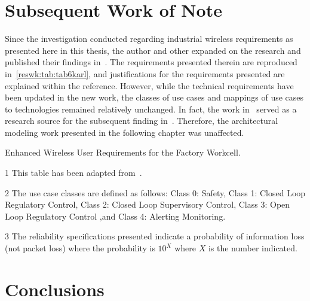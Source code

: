 	\section{Subsequent Work of Note}
	
	Since the investigation conducted regarding industrial wireless requirements as presented here in this thesis, the author and other expanded on the research and published their findings in~\cite{Montgomery2019}.  The requirements presented therein are reproduced in~\ref{reswk:tab:tab6karl}, and justifications for the requirements presented are explained within the reference.  However, while the technical requirements have been updated in the new work, the classes of use cases and mappings of use cases to technologies remained relatively unchanged. In fact, the work in~\cite{CandellRW2017} served as a research source for the subsequent finding in~\cite{Montgomery2019}.  Therefore, the architectural modeling work presented in the following chapter was unaffected.
	
	
	
	\begin{table}[tbph!]
		\centering
		\caption{Enhanced Wireless User Requirements for the Factory Workcell.}\label{reswk:tab:tab6karl}
		\begin{threeparttable}[t]
		
		\vspace{3pt}
		\raggedright		
		\begin{tablenotes}
		\item[1] This table has been adapted from~\cite{Montgomery2019}. 
		\item[2] The use case classes are defined as follows: Class 0: Safety, Class 1: Closed Loop Regulatory Control, Class 2: Closed Loop Supervisory Control, Class 3: Open Loop Regulatory Control ,and Class 4: Alerting Monitoring.		
		\item[3] The reliability specifications presented indicate a probability of information loss (not packet loss) where the probability is $10^X$ where $X$ is the number indicated.
		\end{tablenotes}
		\end{threeparttable}
	\end{table}
	

    
	\section{Conclusions}\label{sec:conclusion}
    
